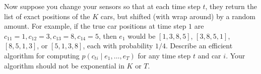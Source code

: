 \item {}
Now suppose you change your sensors so that at each time step $t$, they return
the list of exact positions of the $K$ cars, but shifted (with wrap around) by
a random amount. For example, if the true car positions at time step $1$ are
$c_{11} = 1, c_{12} = 3, c_{13} = 8, c_{14} = 5$, then $e_1$ would be
$[1, 3, 8, 5]$,
$[3, 8, 5, 1]$,
$[8, 5, 1, 3]$, or
$[5, 1, 3, 8]$, each with probability $1/4$.
Describe an efficient algorithm for computing $p(c_{ti} \mid e_1, \dots, e_T)$
for any time step $t$ and car $i$.  Your algorithm should not be exponential
in $K$ or $T$.
